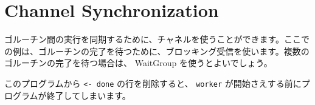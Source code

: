 \section{Channel Synchronization}

ゴルーチン間の実行を同期するために、チャネルを使うことができます。ここでの例は、ゴルーチンの完了を待つために、ブロッキング受信を使います。複数のゴルーチンの完了を待つ場合は、 WaitGroup を使うとよいでしょう。




このプログラムから \texttt{<- done} の行を削除すると、 \texttt{worker} が開始さえする前にプログラムが終了してしまいます。